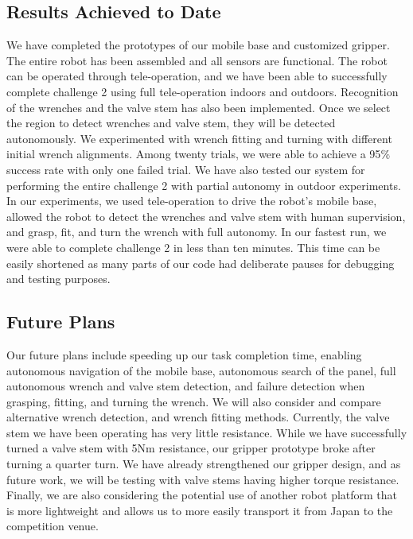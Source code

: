 \documentclass{standalone}
\begin{document}
\subsection{Results Achieved to Date}
We have completed the prototypes of our mobile base and customized gripper. The entire robot has been assembled and all sensors are functional. The robot can be operated through tele-operation, and we have been able to successfully complete challenge 2 using full tele-operation indoors and outdoors. 
Recognition of the wrenches and the valve stem has also been implemented. Once we select the region to detect wrenches and valve stem, they will be detected autonomously.
We experimented with wrench fitting and turning with different initial wrench alignments. Among twenty trials, we were able to achieve a 95$\%$ success rate with only one failed trial. 
We have also tested our system for performing the entire challenge 2 with partial autonomy in outdoor experiments. In our experiments, we used tele-operation to drive the robot’s mobile base, allowed the robot to detect the wrenches and valve stem with human supervision, and grasp, fit, and turn the wrench with full autonomy. In our fastest run, we were able to complete challenge 2 in less than ten minutes. This time can be easily shortened as many parts of our code had deliberate pauses for debugging and testing purposes.

\subsection{Future Plans}
Our future plans include speeding up our task completion time, enabling autonomous navigation of the mobile base, autonomous search of the panel, full autonomous wrench and valve stem detection, and failure detection when grasping, fitting, and turning the wrench. We will also consider and compare alternative wrench detection, and wrench fitting methods. Currently, the valve stem we have been operating has very little resistance. While we have successfully turned a valve stem with 5Nm resistance, our gripper prototype broke after turning a quarter turn. We have already strengthened our gripper design, and as future work, we will be testing with valve stems having higher torque resistance.  Finally, we are also considering the potential use of another robot platform that is more lightweight and allows us to more easily transport it from Japan to the competition venue. 
\end{document}
